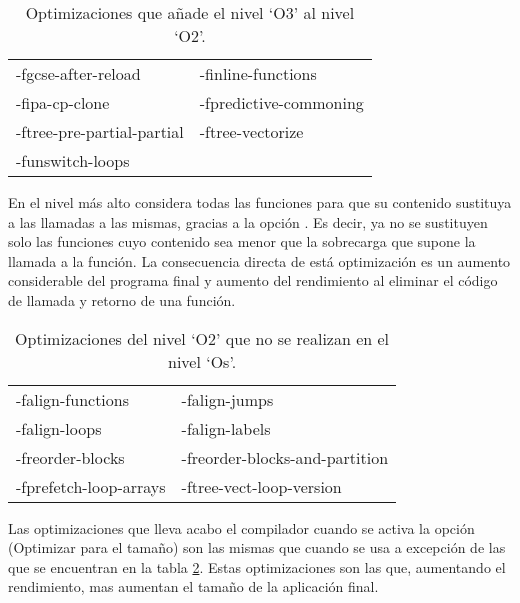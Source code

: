 \begin{table}[H]
\begin{center}
	\begin{tabular}{|ll|}
		\hline
		-fgcse-after-reload & -finline-functions\\
		-fipa-cp-clone & -fpredictive-commoning\\
		-ftree-pre-partial-partial & -ftree-vectorize\\
		-funswitch-loops & \\
		\hline
	\end{tabular}
\end{center}
\caption{Optimizaciones que añade el nivel `O3' al nivel `O2'.}
\label{optimizaciones3}
\end{table}

En el nivel más alto  considera todas las funciones para que su contenido sustituya a las llamadas a las mismas, gracias a la opción . Es decir, ya no se sustituyen solo las funciones cuyo contenido sea menor que la sobrecarga que supone la llamada a la función. La consecuencia directa de está optimización es un aumento considerable del programa final y aumento del rendimiento al eliminar el código de llamada y retorno de una función. 

\begin{table}[H]
\begin{center}
	\begin{tabular}{|ll|}
		\hline
		-falign-functions & -falign-jumps\\
		-falign-loops & -falign-labels\\
		-freorder-blocks & -freorder-blocks-and-partition\\
		-fprefetch-loop-arrays & -ftree-vect-loop-version\\
		\hline
\end{tabular}
\end{center}
\caption{Optimizaciones del nivel `O2' que no se realizan en el nivel `Os'.}
\label{optimizaciones_s}
\end{table}

Las optimizaciones que lleva acabo el compilador cuando se activa la opción  (Optimizar para el tamaño) son las mismas que cuando se usa  a excepción de las que se encuentran en la tabla \ref{optimizaciones_s}. Estas optimizaciones son las que, aumentando el rendimiento, mas aumentan el tamaño de la aplicación final.

